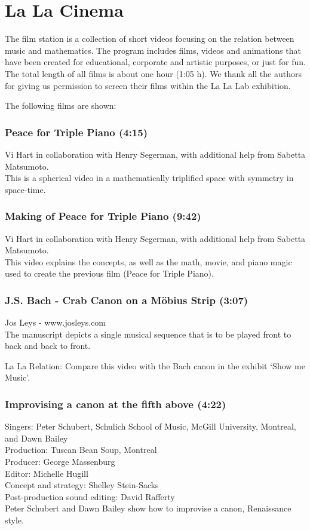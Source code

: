\section{La La Cinema}

The film station is a collection of short videos focusing on the relation between music and mathematics. The program includes films, videos and animations that have been created for educational, corporate and artistic purposes, or just for fun. The total length of all films is about one hour (1:05 h). We thank all the authors for giving us permission to screen their films within the La La Lab exhibition.

The following films are shown:

\subsubsection*{Peace for Triple Piano (4:15)}
Vi Hart in collaboration with Henry Segerman, with additional help from Sabetta Matsumoto. \\
This is a spherical video in a mathematically triplified space with symmetry in space-time.

\subsubsection*{Making of Peace for Triple Piano (9:42)}
Vi Hart in collaboration with Henry Segerman, with additional help from Sabetta Matsumoto.\\
This video explains the concepts, as well as the math, movie, and piano magic used to create the previous film (Peace for Triple Piano).

\subsubsection*{J.S. Bach - Crab Canon on a Möbius Strip (3:07)}
Jos Leys - www.josleys.com \\
The manuscript depicts a single musical sequence that is to be played front to back and back to front.

La La Relation: Compare this video with the Bach canon in the exhibit `Show me Music'.

\subsubsection*{Improvising a canon at the fifth above (4:22)}
Singers: Peter Schubert, Schulich School of Music, McGill University, Montreal, and Dawn Bailey\\
Production: Tuscan Bean Soup, Montreal\\
Producer: George Massenburg\\
Editor: Michelle Hugill\\
Concept and strategy: Shelley Stein-Sacks\\
Post-production sound editing: David Rafferty\\
Peter Schubert and Dawn Bailey show how to improvise a canon, Renaissance style. 


